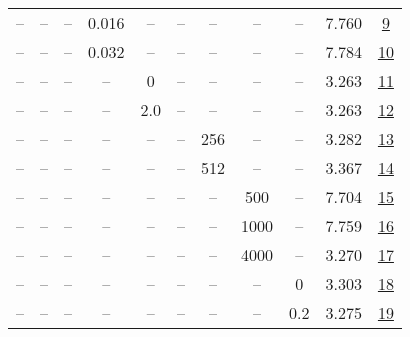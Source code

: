 \begin{table}[H]
\begin{tabular}{ccccccccccc}
-- & -- & -- & 0.016 & -- & -- & -- & -- & -- & 7.760 & \href{https://wandb.ai/stanford-mercury/optimizer-scaling/runs/sweep-300m-6B-adamw2c8c47lr0.016-wd0.1-minlr0-warmup2000-b10.9-b-689737}{9} \\
-- & -- & -- & 0.032 & -- & -- & -- & -- & -- & 7.784 & \href{https://wandb.ai/stanford-mercury/optimizer-scaling/runs/sweep-300m-6B-adamwb6e480lr0.032-wd0.1-minlr0-warmup2000-b10.9-b-ff992d}{10} \\
-- & -- & -- & -- & 0 & -- & -- & -- & -- & 3.263 & \href{https://wandb.ai/stanford-mercury/optimizer-scaling/runs/sweep-300m-6B-adamw418b0elr0.008-wd0.1-minlr0-warmup2000-b10.9-b-e82fe9}{11} \\
-- & -- & -- & -- & 2.0 & -- & -- & -- & -- & 3.263 & \href{https://wandb.ai/stanford-mercury/optimizer-scaling/runs/sweep-300m-6B-adamw4cdb6blr0.008-wd0.1-minlr0-warmup2000-b10.9-b-6bba10}{12} \\
-- & -- & -- & -- & -- & -- & 256 & -- & -- & 3.282 & \href{https://wandb.ai/stanford-mercury/optimizer-scaling/runs/sweep-300m-6B-adamw5d409dlr0.008-wd0.1-minlr0-warmup2000-b10.9-b-632ec9}{13} \\
-- & -- & -- & -- & -- & -- & 512 & -- & -- & 3.367 & \href{https://wandb.ai/stanford-mercury/optimizer-scaling/runs/sweep-300m-6B-adamw2a43e8lr0.008-wd0.1-minlr0-warmup2000-b10.9-b-0d1c6f}{14} \\
-- & -- & -- & -- & -- & -- & -- & 500 & -- & 7.704 & \href{https://wandb.ai/stanford-mercury/optimizer-scaling/runs/sweep-300m-6B-adamw35a912lr0.008-wd0.1-minlr0-warmup500-b10.9-b2-a0e68a}{15} \\
-- & -- & -- & -- & -- & -- & -- & 1000 & -- & 7.759 & \href{https://wandb.ai/stanford-mercury/optimizer-scaling/runs/sweep-300m-6B-adamw0c358elr0.008-wd0.1-minlr0-warmup1000-b10.9-b-0be6f6}{16} \\
-- & -- & -- & -- & -- & -- & -- & 4000 & -- & 3.270 & \href{https://wandb.ai/stanford-mercury/optimizer-scaling/runs/sweep-300m-6B-adamwea4b29lr0.008-wd0.1-minlr0-warmup4000-b10.9-b-531c85}{17} \\
-- & -- & -- & -- & -- & -- & -- & -- & 0 & 3.303 & \href{https://wandb.ai/stanford-mercury/optimizer-scaling/runs/sweep-300m-6B-adamw640457lr0.008-wd0-minlr0-warmup2000-b10.9-b20-12de29}{18} \\
-- & -- & -- & -- & -- & -- & -- & -- & 0.2 & 3.275 & \href{https://wandb.ai/stanford-mercury/optimizer-scaling/runs/sweep-300m-6B-adamwd8feb6lr0.008-wd0.2-minlr0-warmup2000-b10.9-b-ea8bed}{19} \\
\bottomrule
\end{tabular}
\end{table}

